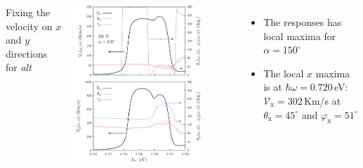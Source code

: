 \documentclass{beamer}
\begin{document}


\begin{frame}

\begin{columns}


{\small Fixing the velocity on $x$ and $y$ directions for \emph{alt}}

\vspace{2mm}

\begin{center}

\vspace{-2mm}

\includegraphics[width=0.80\textwidth]{figs/fig9.pdf}

\end{center}  


{\small

\vspace{-2mm}
\begin{itemize}

\item The responses has local maxima for $\alpha = 150^{\circ}$

\item The local $x$ maxima is at $\hbar\omega = 0.720$\,eV:
$\mathcal{V}_{\mathrm{x}} = 302 $\,Km/s at
$\theta_{\mathrm{x}} = 45^{\circ}$ and
$\varphi_{\mathrm{x}} = 51^{\circ}$


\end{itemize}}
\end{columns}
\end{frame}
\end{document}
